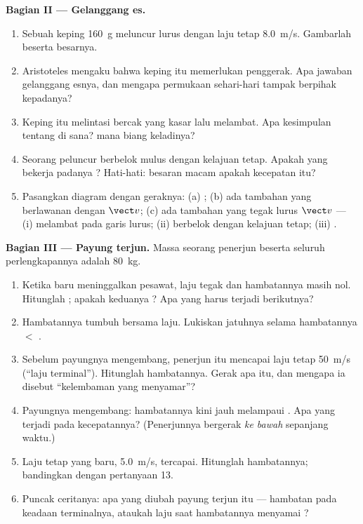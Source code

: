 \begin{problem}
\medskip
\noindent\textbf{Bagian II --- Gelanggang es.}
\begin{enumerate}[resume]
  \item Sebuah keping \qty{160}{g} meluncur lurus dengan laju tetap
        \qty{8.0}{m/s}. Gambarlah  beserta besarnya.
  \item Aristoteles mengaku bahwa keping itu memerlukan penggerak. Apa
        jawaban gelanggang esnya, dan mengapa permukaan sehari-hari
        tampak berpihak kepadanya?
  \item Keping itu melintasi bercak yang kasar lalu melambat. Apa
        kesimpulan tentang  di sana?  mana biang keladinya?
  \item Seorang peluncur berbelok mulus dengan kelajuan tetap. Apakah
         yang bekerja padanya ? Hati-hati: besaran
        macam apakah kecepatan itu?
  \item Pasangkan diagram dengan geraknya: (a) ;
        (b) ada  tambahan yang berlawanan dengan $\vect v$; (c) ada
         tambahan yang tegak lurus $\vect v$ --- (i) melambat pada
        garis lurus; (ii) berbelok dengan kelajuan tetap; (iii) .
\end{enumerate}

\medskip
\noindent\textbf{Bagian III --- Payung terjun.}
Massa seorang penerjun beserta seluruh perlengkapannya adalah
\qty{80}{kg}.
\begin{enumerate}[resume]
  \item Ketika baru meninggalkan pesawat, laju tegak dan hambatannya
        masih nol. Hitunglah ; apakah keduanya ? Apa yang harus terjadi berikutnya?
  \item Hambatannya tumbuh bersama laju. Lukiskan jatuhnya selama
        hambatannya $<$ .
  \item Sebelum payungnya mengembang, penerjun itu mencapai laju tetap
        \qty{50}{m/s} (``laju terminal''). Hitunglah hambatannya. Gerak
        apa itu, dan mengapa ia disebut ``kelembaman yang menyamar''?
  \item Payungnya mengembang: hambatannya kini jauh melampaui .
        Apa yang terjadi pada kecepatannya? (Penerjunnya bergerak
        \emph{ke bawah} sepanjang waktu.)
  \item Laju tetap yang baru, \qty{5.0}{m/s}, tercapai. Hitunglah
        hambatannya; bandingkan dengan pertanyaan 13.
  \item Puncak ceritanya: apa yang diubah payung terjun itu ---
        hambatan pada keadaan terminalnya, ataukah laju saat
        hambatannya menyamai ?
\end{enumerate}


\end{problem}
